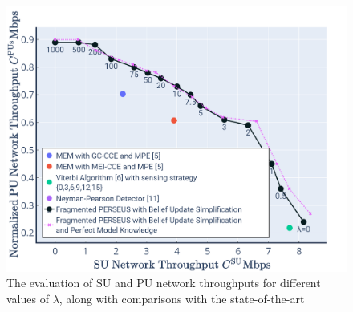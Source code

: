 \begin{figure} [htb]
    \centerline{
    \includegraphics[width = 1.0\textwidth]{Final.PNG}}
    \caption{The evaluation of SU and PU network throughputs for different values of $\lambda$, along with comparisons with the state-of-the-art}
    \label{Fig. 4}
\end{figure}

